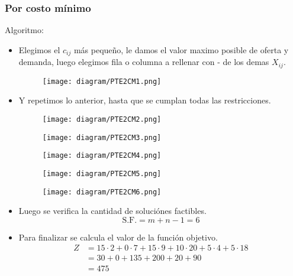 \documentclass{templateNote}
\begin{document}
\newpage
\subsubsection*{Por costo mínimo}
Algoritmo:
\begin{itemize}
    \item Elegimos el $c_{ij}$ más pequeño, le damos el valor maximo posible de oferta y demanda, luego elegimos fila o columna a rellenar con - de los demas $X_{ij}$.
    \begin{figure}[H]
        \centering
        \texttt{[image: diagram/PTE2CM1.png]}
    \end{figure}
    
    \item Y repetimos lo anterior, hasta que se cumplan todas las restricciones.
    \begin{figure}[H]
        \centering
        \texttt{[image: diagram/PTE2CM2.png]}
    \end{figure}

    \begin{figure}[H]
        \centering
        \texttt{[image: diagram/PTE2CM3.png]}
    \end{figure}

    \begin{figure}[H]
        \centering
        \texttt{[image: diagram/PTE2CM4.png]}
    \end{figure}
    
    \begin{figure}[H]
        \centering
        \texttt{[image: diagram/PTE2CM5.png]}
    \end{figure}
    
    \begin{figure}[H]
        \centering
        \texttt{[image: diagram/PTE2CM6.png]}
    \end{figure}

    \item Luego se verifica la cantidad de soluciónes factibles.
    \begin{equation*}
        \text{S.F.} = m+n-1 = 6
    \end{equation*}

    \item Para finalizar se calcula el valor de la función objetivo.
    \begin{align*}
        Z &= 15 \cdot 2 + 0 \cdot 7 + 15 \cdot 9 + 10 \cdot 20 + 5 \cdot 4 + 5 \cdot 18\\
        &= 30 + 0 + 135 + 200 + 20 + 90 \\
        &= 475
    \end{align*}
\end{itemize}
\end{document}
